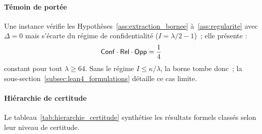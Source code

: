 \begin{sloppypar}
\paragraph{T\'emoin de port\'ee}

Une instance v\'erifie les Hypoth\`eses~\ref{ass:extraction_bornee} \`a~\ref{ass:regularite} avec $\Delta = 0$
mais s'\'ecarte du r\'egime de confidentialit\'e ($I = \lambda/2 - 1$)~; elle
pr\'esente :
\begin{equation}
\mathsf{Conf} \cdot \mathsf{Rel} \cdot \mathsf{Opp} = \frac{1}{4}
\end{equation}
constant pour tout $\lambda \geq 64$. Sans le r\'egime
$I \leq \kappa/\lambda$, la borne tombe donc~; la sous-section~\ref{subsec:lean4_formulations}
d\'etaille ce cas limite.

\paragraph{Hi\'erarchie de certitude}

Le tableau~\ref{tab:hierarchie_certitude} synth\'etise les r\'esultats
formels class\'es selon leur niveau de certitude.


\end{sloppypar}
